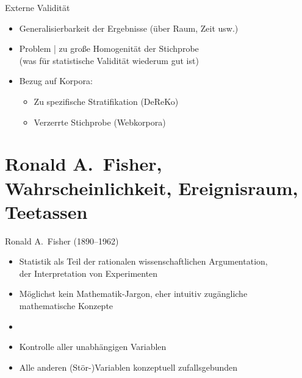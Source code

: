 \begin{frame}
  {Externe Validität}
  \begin{itemize}[<+->]
    \item \alert{Generalisierbarkeit der Ergebnisse} (über Raum, Zeit usw.)
      \Zeile
    \item Problem | \alert{zu große Homogenität der Stichprobe}\\
      (was für statistische Validität wiederum gut ist)
      \Halbzeile
    \item Bezug auf Korpora:
      \begin{itemize}[<+->]
	\item Zu spezifische Stratifikation (DeReKo)
	\item Verzerrte Stichprobe (Webkorpora)
      \end{itemize}
  \end{itemize}
\end{frame}

\section{Ronald A.\ Fisher, Wahrscheinlichkeit, Ereignisraum, Teetassen}

\begin{frame}
  {Ronald A.\ Fisher (1890--1962)}
  \begin{itemize}[<+->]
    \item Statistik als Teil der rationalen wissenschaftlichen Argumentation,\\
      der Interpretation von Experimenten
      \Viertelzeile
    \item Möglichst kein Mathematik-Jargon, eher intuitiv zugängliche\\
      mathematische Konzepte
      \Halbzeile
    \item {}
      \Halbzeile
    \item Kontrolle aller unabhängigen Variablen
    \item \alert{Alle anderen (Stör-)Variablen konzeptuell zufallsgebunden}
  \end{itemize}
\end{frame}

